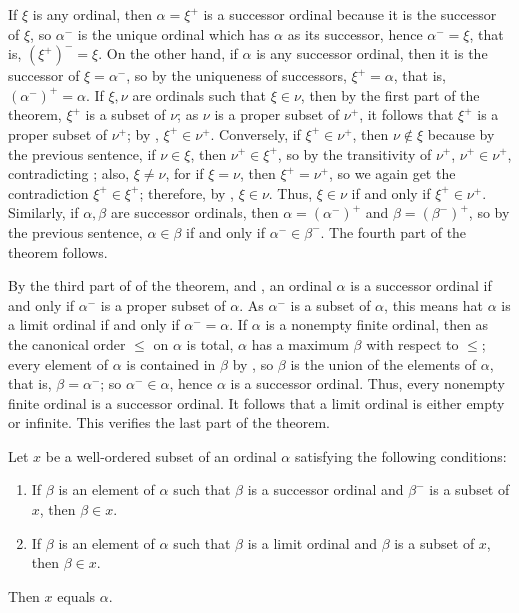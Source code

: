 \documentclass{article}
\begin{document}
If \(\xi\) is any ordinal, then \(\alpha = \xi^+\) is a successor
ordinal because it is the successor of \(\xi\), so \(\alpha^-\) is the
unique ordinal which has \(\alpha\) as its successor, hence
\(\alpha^- = \xi\), that is, \((\xi^+)^- = \xi\).  On the other hand,
if \(\alpha\) is any successor ordinal, then it is the successor of
\(\xi = \alpha^-\), so by the uniqueness of successors,
\(\xi^+ = \alpha\), that is, \((\alpha^-)^+ = \alpha\).  If
\(\xi, \nu\) are ordinals such that \(\xi \in \nu\), then by the first
part of the theorem, \(\xi^+\) is a subset of \(\nu\); as \(\nu\) is a
proper subset of \(\nu^+\), it follows that \(\xi^+\) is a proper
subset of \(\nu^+\); by , \(\xi^+ \in \nu^+\).
Conversely, if \(\xi^+ \in \nu^+\), then \(\nu \notin \xi\) because by
the previous sentence, if \(\nu \in \xi\), then \(\nu^+ \in \xi^+\),
so by the transitivity of \(\nu^+\), \(\nu^+ \in \nu^+\),
contradicting ; also, \(\xi \neq \nu\), for if
\(\xi = \nu\), then \(\xi^+ = \nu^+\), so we again get the
contradiction \(\xi^+ \in \xi^+\); therefore, by ,
\(\xi \in \nu\).  Thus, \(\xi \in \nu\) if and only if
\(\xi^+ \in \nu^+\).  Similarly, if \(\alpha, \beta\) are successor
ordinals, then \(\alpha = (\alpha^-)^+\) and \(\beta = (\beta^-)^+\),
so by the previous sentence, \(\alpha \in \beta\) if and only if
\(\alpha^- \in \beta^-\).  The fourth part of the theorem follows.

By the third part of of the theorem, and , an
ordinal \(\alpha\) is a successor ordinal if and only if \(\alpha^-\)
is a proper subset of \(\alpha\).  As \(\alpha^-\) is a subset of
\(\alpha\), this means hat \(\alpha\) is a limit ordinal if and only
if \(\alpha^- = \alpha\).  If \(\alpha\) is a nonempty finite ordinal,
then as the canonical order \(\leq\) on \(\alpha\) is total,
\(\alpha\) has a maximum \(\beta\) with respect to \(\leq\); every
element of \(\alpha\) is contained in \(\beta\) by
, so \(\beta\) is the union of the elements of
\(\alpha\), that is, \(\beta = \alpha^-\); so \(\alpha^- \in \alpha\),
hence \(\alpha\) is a successor ordinal.  Thus, every nonempty finite
ordinal is a successor ordinal.  It follows that a limit ordinal is
either empty or infinite.  This verifies the last part of the theorem.

\begin{theorem}
  \label{thm:a5jdoffh}
  Let \(x\) be a well-ordered subset of an ordinal \(\alpha\)
  satisfying the following conditions:
  \begin{enumerate}
  \item If \(\beta\) is an element of \(\alpha\) such that \(\beta\)
    is a successor ordinal and \(\beta^-\) is a subset of \(x\), then
    \(\beta \in x\).
  \item If \(\beta\) is an element of \(\alpha\) such that \(\beta\)
    is a limit ordinal and \(\beta\) is a subset of \(x\), then
    \(\beta \in x\).
  \end{enumerate}
  Then \(x\) equals \(\alpha\).
\end{theorem}
\end{document}
